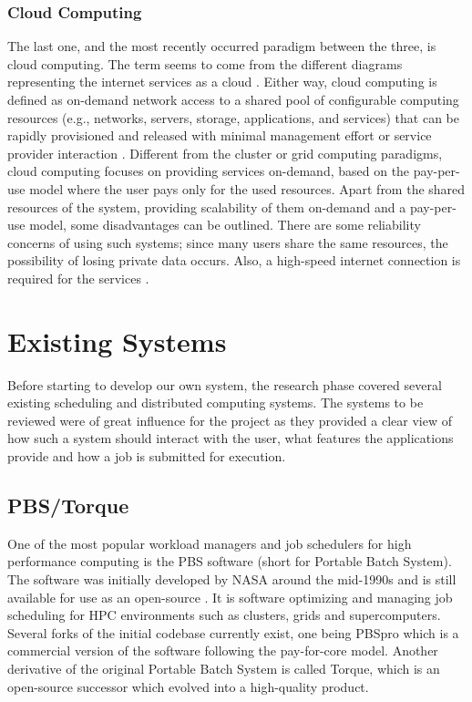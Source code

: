 \documentclass[10pt]{report}
\begin{document}
\subsubsection*{Cloud Computing}

The last one, and the most recently occurred paradigm between the three, is cloud computing. The term seems to come from the different diagrams representing the internet services as a cloud \cite{cloud}. Either way, cloud computing is defined as on-demand network access to a shared pool of configurable computing resources (e.g., networks, servers, storage, applications, and services) that can be rapidly provisioned and released with minimal management effort or service provider interaction \cite{definitionCloud}. Different from the cluster or grid computing paradigms, cloud computing focuses on providing services on-demand, based on the pay-per-use model where the user pays only for the used resources. Apart from the shared resources of the system, providing scalability of them on-demand and a pay-per-use model, some disadvantages can be outlined. There are some reliability concerns of using such systems; since many users share the same resources, the possibility of losing private data occurs. Also, a high-speed internet connection is required for the services \cite{paradigms}.

\section{Existing Systems} \label{existing}

Before starting to develop our own system, the research phase covered several existing scheduling and distributed computing systems. The systems to be reviewed were of great influence for the project as they provided a clear view of how such a system should interact with the user, what features the applications provide and how a job is submitted for execution.

\subsection{PBS/Torque}

One of the most popular workload managers and job schedulers for high performance computing is the PBS software (short for Portable Batch System). The software was initially developed by NASA around the mid-1990s and is still available for use as an open-source \cite{nasa}. It is software optimizing and managing job scheduling for HPC environments such as clusters, grids and supercomputers. Several forks of the initial codebase currently exist, one being PBSpro which is a commercial version of the software following the pay-for-core model. Another derivative of the original Portable Batch System is called Torque, which is an open-source successor which evolved into a high-quality product.
\newline
\end{document}
